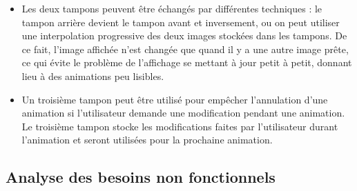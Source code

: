 \documentclass[12pt]{article}
\begin{document}
\begin{itemize}
\begin{itemize}
	\item Les deux tampons peuvent être échangés par différentes techniques : le tampon arrière devient le tampon avant et
	inversement, ou on peut utiliser une interpolation progressive des deux images stockées dans les tampons. De ce fait, l'image affichée n'est changée
	que quand il y a une autre image prête, ce qui évite le problème de l'affichage se mettant à jour petit à petit, donnant lieu à des animations peu
	lisibles.
	\item Un troisième tampon peut être utilisé pour empêcher l'annulation d'une animation si l'utilisateur demande une modification pendant une
	animation. Le troisième tampon stocke les modifications faites par l'utilisateur durant l'animation et seront utilisées pour la prochaine animation.
	\end{itemize}
\end{itemize}


\subsection{Analyse des besoins non fonctionnels}
\end{document}
